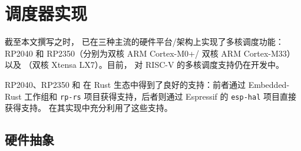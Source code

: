 
\section{\OSname{} 调度器实现}



截至本文撰写之时，\OSname{} 已在三种主流的硬件平台/架构上实现了多核调度功能：RP2040 和 RP2350（分别为双核 ARM Cortex-M0+/ 双核 ARM Cortex-M33）以及 \espsthree{}（双核 Xtensa LX7）。目前，\OSname{} 对 RISC-V 的多核调度支持仍在开发中。%

RP2040、RP2350 和 \espsthree{} 在 Rust 生态中得到了良好的支持：前者通过 Embedded-Rust 工作组和 \verb|rp-rs| 项目获得支持，后者则通过 Espressif 的 \verb|esp-hal| 项目直接获得支持。
\OSname{} 在其实现中充分利用了这些支持。


\subsection{硬件抽象}


